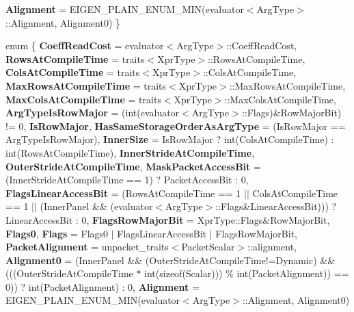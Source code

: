 \begin{DoxyCompactItemize}
{\bfseries Alignment} = E\+I\+G\+E\+N\+\_\+\+P\+L\+A\+I\+N\+\_\+\+E\+N\+U\+M\+\_\+\+M\+IN(evaluator$<$Arg\+Type$>$\+:\+:Alignment, Alignment0)
 \}
\item 
\mbox{\label{struct_eigen_1_1internal_1_1evaluator_3_01_block_3_01_arg_type_00_01_block_rows_00_01_block_cols_00_01_inner_panel_01_4_01_4_ab6c5b6eabf48a38abea832d93039e8de}} 
enum \{ \newline
{\bfseries Coeff\+Read\+Cost} = evaluator$<$Arg\+Type$>$\+:\+:Coeff\+Read\+Cost, 
{\bfseries Rows\+At\+Compile\+Time} = traits$<$Xpr\+Type$>$\+:\+:Rows\+At\+Compile\+Time, 
{\bfseries Cols\+At\+Compile\+Time} = traits$<$Xpr\+Type$>$\+:\+:Cols\+At\+Compile\+Time, 
{\bfseries Max\+Rows\+At\+Compile\+Time} = traits$<$Xpr\+Type$>$\+:\+:Max\+Rows\+At\+Compile\+Time, 
\newline
{\bfseries Max\+Cols\+At\+Compile\+Time} = traits$<$Xpr\+Type$>$\+:\+:Max\+Cols\+At\+Compile\+Time, 
{\bfseries Arg\+Type\+Is\+Row\+Major} = (int(evaluator$<$Arg\+Type$>$\+:\+:Flags)\&Row\+Major\+Bit) != 0, 
{\bfseries Is\+Row\+Major}, 
{\bfseries Has\+Same\+Storage\+Order\+As\+Arg\+Type} = (Is\+Row\+Major == Arg\+Type\+Is\+Row\+Major), 
\newline
{\bfseries Inner\+Size} = Is\+Row\+Major ? int(Cols\+At\+Compile\+Time) \+: int(Rows\+At\+Compile\+Time), 
{\bfseries Inner\+Stride\+At\+Compile\+Time}, 
{\bfseries Outer\+Stride\+At\+Compile\+Time}, 
{\bfseries Mask\+Packet\+Access\+Bit} = (Inner\+Stride\+At\+Compile\+Time == 1) ? Packet\+Access\+Bit \+: 0, 
\newline
{\bfseries Flags\+Linear\+Access\+Bit} = (Rows\+At\+Compile\+Time == 1 $\vert$$\vert$ Cols\+At\+Compile\+Time == 1 $\vert$$\vert$ (Inner\+Panel \&\& (evaluator$<$Arg\+Type$>$\+:\+:Flags\&Linear\+Access\+Bit))) ? Linear\+Access\+Bit \+: 0, 
{\bfseries Flags\+Row\+Major\+Bit} = Xpr\+Type\+:\+:Flags\&Row\+Major\+Bit, 
{\bfseries Flags0}, 
{\bfseries Flags} = Flags0 $\vert$ Flags\+Linear\+Access\+Bit $\vert$ Flags\+Row\+Major\+Bit, 
\newline
{\bfseries Packet\+Alignment} = unpacket\+\_\+traits$<$Packet\+Scalar$>$\+:\+:alignment, 
{\bfseries Alignment0} = (Inner\+Panel \&\& (Outer\+Stride\+At\+Compile\+Time!=Dynamic) \&\& (((Outer\+Stride\+At\+Compile\+Time $\ast$ int(sizeof(Scalar))) \% int(Packet\+Alignment)) == 0)) ? int(Packet\+Alignment) \+: 0, 
{\bfseries Alignment} = E\+I\+G\+E\+N\+\_\+\+P\+L\+A\+I\+N\+\_\+\+E\+N\+U\+M\+\_\+\+M\+IN(evaluator$<$Arg\+Type$>$\+:\+:Alignment, Alignment0)

\end{DoxyCompactItemize}

